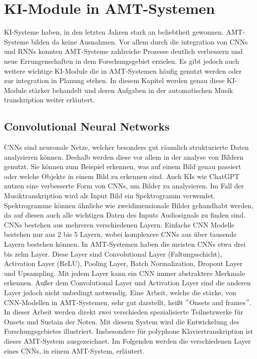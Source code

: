 \section{KI-Module in AMT-Systemen}
\label{sec:ki_integration}
KI-Systeme haben, in den letzten Jahren stark an beliebtheit gewonnen.
AMT-Systeme bilden da keine Ausnahmen.
Vor allem durch die integration von CNNs und RNNs konnten AMT-Systeme zahlreiche Prozesse deutlich verbessern
und neue Errungenschaften in dem Forschungsgebiet erzielen.
Es gibt jedoch auch weitere wichtige KI-Module die in AMT-Systemen häufig genutzt werden
oder zur integration in Planung stehen.
In diesem Kapitel werden genau diese KI-Module stärker behandelt
und deren Aufgaben in der automatischen Musik transkription weiter erläutert.

\subsection{Convolutional Neural Networks}
CNNs sind neuronale Netze, welcher besonders gut räumlich strukturierte Daten analysieren können.
Deshalb werden diese vor allem in der analyse von Bildern genutzt.
Sie können zum Beispiel erkennen, was auf einem Bild genau passiert oder welche Objekte in einem Bild zu erkennen sind.
Auch KIs wie ChatGPT nutzen eine verbesserte Form von CNNs, um Bilder zu analysieren.
Im Fall der Musiktranskription wird als Input Bild ein Spektrogramm verwendet.
Spektrogramme können ähnliche wie zweidimensionale Bilder gehandhabt werden,
da auf diesen auch alle wichtigen Daten des Inputs Audiosignals zu finden sind.
CNNs bestehen aus mehreren verschiedenen Layern.
Einfache CNN Modelle bestehen nur aus 2 bis 5 Layern,
wobei komplexere CNNs aus über tausende Layern bestehen können.
In AMT-Systemen haben die meisten CNNs etwa drei bis zehn Layer.
Diese Layer sind Convolutional Layer (Faltungsschicht), Activation Layer (ReLU), Pooling Layer,
Batch Normalization, Dropout Layer und Upsampling.
Mit jedem Layer kann ein CNN immer abstraktere Merkmale erkennen.
Außer dem Convolutional Layer und Activation Layer sind die anderen Layer jedoch nicht unbedingt notwendig.
Eine Arbeit, welche die stärke, von CNN-Modellen in AMT-Systemen, sehr gut darstellt, heißt \("\)Onsets and frames\("\).
\cite{hawthorne2017onsets}
In dieser Arbeit werden direkt zwei verschieden spezialisierte Teilnetzwerke für Onsets und Sustain der Noten.
Mit diesem System wird die Entwickelung des Forschungsgebietes illustriert.
Insbesondere für polyphone Klaviertranskription ist dieses AMT-System ausgezeichnet.
Im Folgenden werden die verschiedenen Layer eines CNNs, in einem AMT-System, erläutert.

